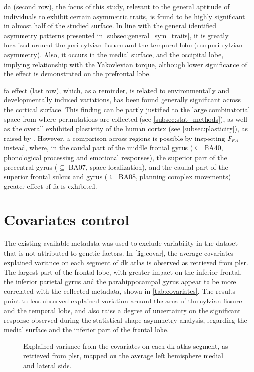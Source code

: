 \Ac{da} (second row), the focus of this study, relevant to the general aptitude of individuals to exhibit certain asymmetric traits, is found to be highly significant in almost half of the studied surface. In line with the general identified asymmetry patterns presented in \autoref{subsec:general_sym_traits}, it is greatly localized around the peri-sylvian fissure and the temporal lobe (see peri-sylvian asymmetry). Also, it occurs in the medial surface, and the occipital lobe, implying relationship with the Yakovlevian torque, although lower significance of the effect is demonstrated on the prefrontal lobe.

\Ac{fa} effect (last row), which, as a reminder, is related to environmentally and developmentally induced variations, has been found generally significant across the cortical surface. This finding can be partly justified to the large combinatorial space from where permutations are collected (see \autoref{subsec:stat_methods}), as well as the overall exhibited plasticity of the human cortex (see \autoref{subsec:plasticity}), as raised by \citet{Vanbiervliet2022}. However, a comparison across regions is possible by inspecting  $F_{FA}$ instead, where, in the caudal part of the middle frontal gyrus ($\subseteq$ BA40, phonological processing and emotional responses), the superior part of the precentral gyrus ($\subseteq$ BA07, space localization), and the caudal part of the superior frontal sulcus and gyrus ($\subseteq$ BA08, planning complex movements) greater effect of \ac{fa} is exhibited.


\section{Covariates control}
The existing available metadata was used to exclude variability in the dataset that is not attributed to genetic factors. In \autoref{fig:covar}, the average covariates explained variance on each segment of \ac{dk} atlas is observed as retrieved from \ac{plsr}. The largest part of the frontal lobe, with greater impact on the inferior frontal, the inferior parietal gyrus and the parahippocampal gyrus appear to be more correlated with the collected metadata, shown in \autoref{tab:covariates}. The results point to less observed explained variation around the area of the sylvian fissure and the temporal lobe, and also raise a degree of uncertainty on the significant response observed during the statistical shape asymmetry analysis, regarding the medial surface and the inferior part of the frontal lobe.
\begin{figure}[H]
	\centering

\caption[Explained variance from covariates]{Explained variance from the covariates on each \ac{dk} atlas segment, as retrieved from \ac{plsr}, mapped on the average left hemisphere medial and lateral side.}
\label{fig:covar}
\end{figure}
